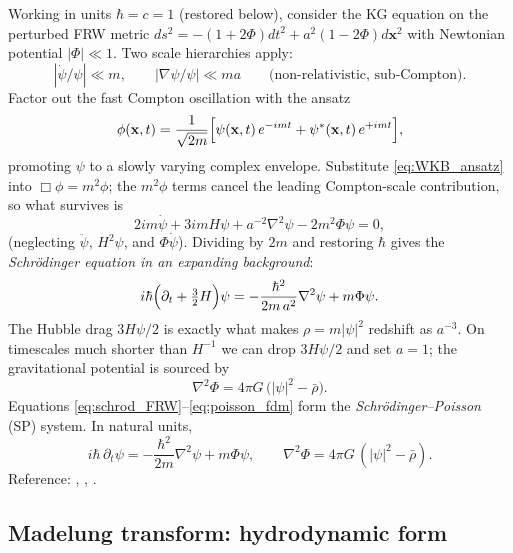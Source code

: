 \documentclass[12pt]{article}
\newcommand{\bx}{\mathbf{x}}
\begin{document}
Working in units $\hbar=c=1$ (restored below), consider the KG
equation on the perturbed FRW metric
$ds^2 = -(1+2\Phi)dt^2 + a^2(1-2\Phi)d\bx^2$
with Newtonian potential $|\Phi|\ll 1$.  Two scale hierarchies apply:
%
\begin{equation}
  |\dot\psi/\psi| \ll m,
  \qquad
  |\nabla\psi/\psi| \ll ma
  \qquad\text{(non-relativistic, sub-Compton).}
\end{equation}
%
Factor out the fast Compton oscillation with the ansatz
%
\begin{equation}
  \phi(\bx,t) = \frac{1}{\sqrt{2m}}
                \Bigl[\psi(\bx,t)\,e^{-imt} + \psi^*(\bx,t)\,e^{+imt}\Bigr],
  \label{eq:WKB_ansatz}
\end{equation}
%
promoting $\psi$ to a slowly varying complex envelope.  Substitute
\eqref{eq:WKB_ansatz} into $\Box\phi = m^2\phi$; the $m^2\phi$ terms
cancel the leading Compton-scale contribution, so what survives is
%
\begin{equation}
  2im\dot\psi + 3imH\psi + a^{-2}\nabla^2\psi - 2m^2\Phi\psi = 0,
\end{equation}
%
(neglecting $\ddot\psi$, $H^2\psi$, and $\Phi\dot\psi$).  Dividing by
$2m$ and restoring $\hbar$ gives the \emph{Schr\"odinger equation in
an expanding background}:
%
\begin{equation}
  i\hbar\Bigl(\partial_t + \tfrac{3}{2}H\Bigr)\psi
    = -\frac{\hbar^2}{2m\,a^2}\nabla^2\psi + m\Phi\psi.
  \label{eq:schrod_FRW}
\end{equation}
%
The Hubble drag $3H\psi/2$ is exactly what makes
$\rho = m|\psi|^2$ redshift as $a^{-3}$.  On timescales much shorter
than $H^{-1}$ we can drop $3H\psi/2$ and set $a=1$; the gravitational
potential is sourced by
%
\begin{equation}
  \nabla^2\Phi = 4\pi G\,\bigl(|\psi|^2 - \bar\rho\bigr).
  \label{eq:poisson_fdm}
\end{equation}
%
Equations \eqref{eq:schrod_FRW}--\eqref{eq:poisson_fdm} form the
\emph{Schr\"odinger--Poisson} (SP) system.  In natural units,
%
\begin{equation}
  i\hbar\,\partial_t\psi
    = -\frac{\hbar^2}{2m}\nabla^2\psi + m\Phi\psi,
  \qquad
  \nabla^2\Phi = 4\pi G\,(|\psi|^2-\bar\rho).
  \label{eq:SP}
\end{equation}
%
Reference: \citet{Hu2000}, \citet{Marsh2016}, \citet{Hui2017}.

\subsection{Madelung transform: hydrodynamic form}
\end{document}
